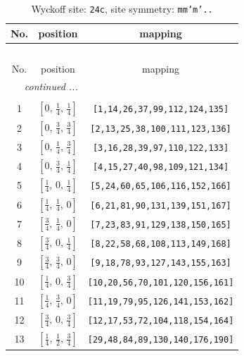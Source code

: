 \documentclass[fleqn,8pt]{jsarticle}
\begin{document}
\begin{longtable}{ccc}
\caption{Wyckoff site: {\tt 24c}, site symmetry: {\tt mm'm'..}}
 \\
 \hline \hline
No. & position & mapping \\ \hline \endfirsthead

\multicolumn{2}{l}{\tablename\ \thetable{}} \\
 \hline \hline
No. & position & mapping \\ \hline \endhead

 \hline \hline
\multicolumn{2}{r}{\footnotesize\it continued ...} \\ \endfoot

 \hline \hline
\multicolumn{2}{r}{} \\ \endlastfoot

1 & $\left[ 0,\, \frac{1}{4},\, \frac{1}{4} \right]$ & {\tt [1,14,26,37,99,112,124,135]} \\ \hline
2 & $\left[ 0,\, \frac{3}{4},\, \frac{3}{4} \right]$ & {\tt [2,13,25,38,100,111,123,136]} \\ \hline
3 & $\left[ 0,\, \frac{1}{4},\, \frac{3}{4} \right]$ & {\tt [3,16,28,39,97,110,122,133]} \\ \hline
4 & $\left[ 0,\, \frac{3}{4},\, \frac{1}{4} \right]$ & {\tt [4,15,27,40,98,109,121,134]} \\ \hline
5 & $\left[ \frac{1}{4},\, 0,\, \frac{1}{4} \right]$ & {\tt [5,24,60,65,106,116,152,166]} \\ \hline
6 & $\left[ \frac{1}{4},\, \frac{1}{4},\, 0 \right]$ & {\tt [6,21,81,90,131,139,151,167]} \\ \hline
7 & $\left[ \frac{3}{4},\, \frac{1}{4},\, 0 \right]$ & {\tt [7,23,83,91,129,138,150,165]} \\ \hline
8 & $\left[ \frac{3}{4},\, 0,\, \frac{1}{4} \right]$ & {\tt [8,22,58,68,108,113,149,168]} \\ \hline
9 & $\left[ \frac{3}{4},\, \frac{3}{4},\, 0 \right]$ & {\tt [9,18,78,93,127,143,155,163]} \\ \hline
10 & $\left[ \frac{1}{4},\, 0,\, \frac{3}{4} \right]$ & {\tt [10,20,56,70,101,120,156,161]} \\ \hline
11 & $\left[ \frac{1}{4},\, \frac{3}{4},\, 0 \right]$ & {\tt [11,19,79,95,126,141,153,162]} \\ \hline
12 & $\left[ \frac{3}{4},\, 0,\, \frac{3}{4} \right]$ & {\tt [12,17,53,72,104,118,154,164]} \\ \hline
13 & $\left[ \frac{1}{4},\, \frac{1}{2},\, \frac{3}{4} \right]$ & {\tt [29,48,84,89,130,140,176,190]} \\ \hline

\end{longtable}
\end{document}
